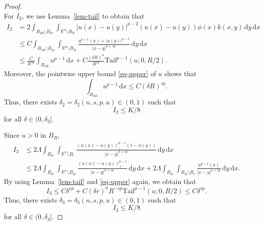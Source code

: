 \documentclass[11pt]{amsart}
\theoremstyle{plain}
\theoremstyle{definition}
\numberwithin{equation}{section}
\begin{document}
\begin{proof}
\begin{equation*}
\end{equation*}
For $I_2$, we use Lemma~\ref{lem-tail} to obtain that
\begin{align*}
I_2
&= 2\int_{B_{\delta R} \setminus B_{\delta r}} \int_{\mathbb{R}^n \setminus B_{R}} |u(x)-u(y)|^{p-2}(u(x)-u(y))\phi(x) k(x, y) \,\mathrm{d}y\,\mathrm{d}x \\
&\leq C \int_{B_{\delta R} \setminus B_{\delta r}} \int_{\mathbb{R}^n \setminus B_{R}} \frac{u^{p-1}(x)+|u(y)|^{p-1}}{|x-y|^{n+sp}} \,\mathrm{d}y\,\mathrm{d}x \\
&\leq \frac{C}{R^{sp}} \int_{B_{\delta R}} u^{p-1} \,\mathrm{d}x + C \frac{(\delta R)^n}{R^{sp}} \mathrm{Tail}^{p-1}(u; 0, R/2).
\end{align*}
Moreover, the pointwise upper bound \eqref{eq-upper} of $u$ shows that
	\begin{equation*}
		\int_{B_{\delta R}}u^{p-1} \,\mathrm{d}x \leq C(\delta R)^{sp}.
	\end{equation*}
Thus, there exists $\delta_2=\delta_2(n,s,p, u) \in (0,1)$ such that
\begin{equation*}
I_2 \leq K/8
\end{equation*}
for all $\delta \in (0, \delta_2]$.

Since $u>0$ in $B_{R}$,
\begin{align*}
	I_3
	&\leq 2\Lambda \int_{B_{\delta r}} \int_{\mathbb{R}^n \setminus B_{r}} \frac{(u(x)-u(y))_+^{p-1} (1-\phi(y))}{|x-y|^{n+sp}} \,\mathrm{d}y\,\mathrm{d}x\\
	&\leq 2\Lambda \int_{B_{\delta r}} \int_{\mathbb{R}^n \setminus B_{R}} \frac{(u(x)-u(y))^{p-1}_+}{|x-y|^{n+sp}} \,\mathrm{d}y\,\mathrm{d}x+2\Lambda \int_{B_{\delta r}} \int_{B_R \setminus B_{r}} \frac{u^{p-1}(x)}{|x-y|^{n+sp}} \,\mathrm{d}y\,\mathrm{d}x.
\end{align*}
By using Lemma~\ref{lem-tail} and \eqref{eq-upper} again, we obtain that
\begin{equation*}
I_3 \leq C\delta^{sp} +C(\delta r)^nR^{-sp} \mathrm{Tail}^{p-1}(u; 0, R/2) \leq C \delta^{sp}.
\end{equation*}
Thus, there exists $\delta_3=\delta_3(n,s,p, u) \in (0,1)$ such that
\begin{equation*}
I_3 \leq K/8
\end{equation*}
for all $\delta \in (0, \delta_3]$.


\end{proof}
\end{document}
